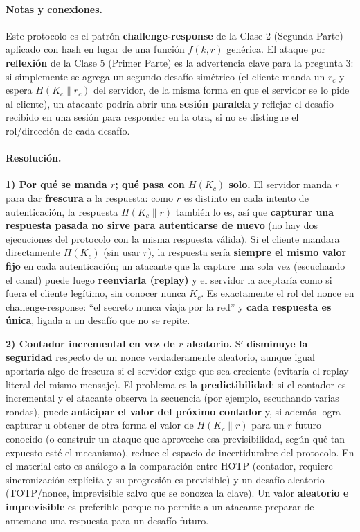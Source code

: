 \paragraph{Notas y conexiones.}
Este protocolo es el patrón \textbf{challenge-response} de la Clase 2 (Segunda
Parte) aplicado con hash en lugar de una función $f(k,r)$ genérica. El ataque por
\textbf{reflexión} de la Clase 5 (Primer Parte) es la advertencia clave para la
pregunta 3: si simplemente se agrega un segundo desafío simétrico (el cliente
manda un $r_c$ y espera $H(K_c\|r_c)$ del servidor, de la misma forma en que el
servidor se lo pide al cliente), un atacante podría abrir una \textbf{sesión
paralela} y reflejar el desafío recibido en una sesión para responder en la otra,
si no se distingue el rol/dirección de cada desafío.

\paragraph{Resolución.}

\textbf{1) Por qué se manda $r$; qué pasa con $H(K_c)$ solo.}
El servidor manda $r$ para dar \textbf{frescura} a la respuesta: como $r$ es
distinto en cada intento de autenticación, la respuesta $H(K_c\|r)$ también lo es,
así que \textbf{capturar una respuesta pasada no sirve para autenticarse de
nuevo} (no hay dos ejecuciones del protocolo con la misma respuesta válida). Si
el cliente mandara directamente $H(K_c)$ (sin usar $r$), la respuesta sería
\textbf{siempre el mismo valor fijo} en cada autenticación; un atacante que la
capture una sola vez (escuchando el canal) puede luego \textbf{reenviarla
(replay)} y el servidor la aceptaría como si fuera el cliente legítimo, sin
conocer nunca $K_c$. Es exactamente el rol del nonce en challenge-response: ``el
secreto nunca viaja por la red'' y \textbf{cada respuesta es única}, ligada a un
desafío que no se repite.

\textbf{2) Contador incremental en vez de $r$ aleatorio.}
Sí \textbf{disminuye la seguridad} respecto de un nonce verdaderamente aleatorio,
aunque igual aportaría algo de frescura si el servidor exige que sea creciente
(evitaría el replay literal del mismo mensaje). El problema es la
\textbf{predictibilidad}: si el contador es incremental y el atacante observa la
secuencia (por ejemplo, escuchando varias rondas), puede \textbf{anticipar el
valor del próximo contador} y, si además logra capturar u obtener de otra forma el
valor de $H(K_c\|r)$ para un $r$ futuro conocido (o construir un ataque que
aproveche esa previsibilidad, según qué tan expuesto esté el mecanismo), reduce el
espacio de incertidumbre del protocolo. En el material esto es análogo a la
comparación entre HOTP (contador, requiere sincronización explícita y su
progresión es previsible) y un desafío aleatorio (TOTP/nonce, imprevisible salvo
que se conozca la clave). Un valor \textbf{aleatorio e imprevisible} es preferible
porque no permite a un atacante preparar de antemano una respuesta para un
desafío futuro.

